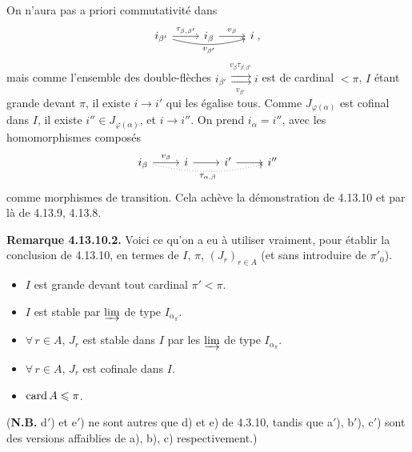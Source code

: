 On n'aura pas a priori commutativité dans
\[
\begin{tikzcd}
i_{\beta'} \arrow[r, "\tau_{\beta,\beta'}"] \arrow[rr, bend right=15, "v_{\beta'}"'] & i_\beta \arrow[r, "v_\beta"] & i \; ,
\end{tikzcd}
\] %
mais comme l'ensemble des double-flèches $i_{\beta'}\mathrel{\overset{v_\beta\tau_{\beta,\beta'}}{\underset{v_{\beta'}}{\rightrightarrows}}} i$ est de cardinal $<\pi$, $I$ étant grande devant $\pi$, il existe $i\longrightarrow i'$ qui les égalise tous. Comme $J_{\varphi(\alpha)}$ est cofinal dans $I$, il existe $i''\in J_{\varphi(\alpha)}$, et $i\longrightarrow i''$. On prend $i_\alpha=i''$, avec les homomorphismes composés
\[
\begin{tikzcd}
i_\beta \arrow[r, "v_\beta"] \arrow[rrr, dotted, bend right=12, "\tau_{\alpha,\beta}"'] & i \arrow[r] & i' \arrow[r] & i''
\end{tikzcd}
\] %
comme morphismes de transition. Cela achève la démonstration de 4.13.10 et par là de 4.13.9, 4.13.8.

\textbf{Remarque 4.13.10.2.} Voici ce qu'on a eu à utiliser vraiment, pour établir la conclusion de 4.13.10, en termes de $I$, $\pi$, $(J_r)_{r\in A}$ (et sans introduire de $\pi'_0$).
\begin{itemize}
\item[\cercle{a$'$}] $I$ est grande devant tout cardinal $\pi'<\pi$.
\item[\cercle{b$'$}] $I$ est stable par $\varinjlim$ de type $I_{\alpha_\pi}$.
\item[\cercle{c$'$}] $\forall\, r\in A$, $J_r$ est stable dans $I$ par les $\varinjlim$ de type $I_{\alpha_\pi}$.
\item[\cercle{d$'$}] $\forall\, r\in A$, $J_r$ est cofinale dans $I$.
\item[\cercle{e$'$}] $\operatorname{card} A\leqslant\pi$.
\end{itemize}
(\textbf{N.B.} d$'$) et e$'$) ne sont autres que d) et e) de 4.3.10, tandis que a$'$), b$'$), c$'$) sont des versions affaiblies de a), b), c) respectivement.) %

